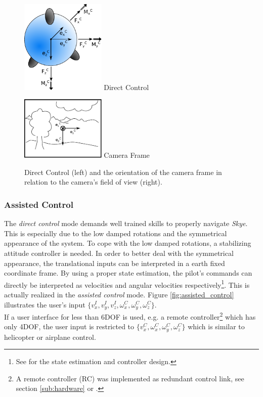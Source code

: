 \begin{figure}[H]		
	\small{
		\begin{center}
			\parbox{0.36\textwidth}{\centering \includegraphics[width=0.36\textwidth]{DC}
			 Direct Control}
			\hspace{0.1\textwidth}			
			\parbox{0.36\textwidth}{\centering \includegraphics[width=0.36\textwidth]{CameraFrame}
			Camera Frame}
	\caption[Assisted Control]{Direct Control (left) and the orientation of the camera frame in relation to the camera's field of view (right).}
		\label{fig:direct_control}
		\end{center}
	}			
	\vspace{4.5mm}
\end{figure}


\subsubsection{Assisted Control} 
The \textit{direct control} mode demands well trained skills to properly navigate \textit{Skye}. This is especially due to the low damped rotations \cite{weichart} and the symmetrical appearance of the system. To cope with the low damped rotations, a stabilizing attitude controller is needed. In order to better deal with the symmetrical appearance, the translational inputs can be interpreted in a earth fixed coordinate frame. By using a proper state estimation, the pilot's commands can directly be interpreted as velocities and angular velocities respectively\footnote{See \cite{meiermueri} for the state estimation and controller design.}. This is actually realized in the \textit{assisted control} mode. Figure \ref{fig:assisted_control} illustrates the user's input $\{v_x^I, v_y^I, v_z^I, \omega_x^C, \omega_y^C, \omega_z^C\}$. \\
If a user interface for less than 6DOF is used, e.g. a remote controller\footnote{A remote controller (RC) was implemented as redundant control link, see section \ref{sub:hardware} or \cite{burri}.} which has only 4DOF, the user input is restricted to $\{v_x^C, \omega_x^C, \omega_y^C, \omega_z^C\}$ which is similar to helicopter or airplane control.

